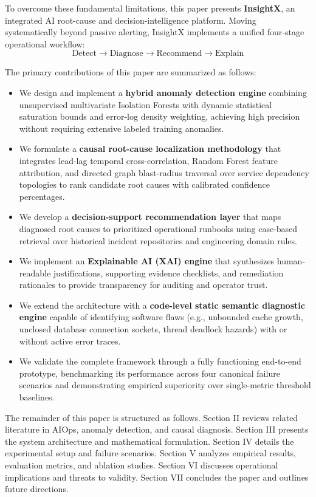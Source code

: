 \documentclass[conference]{IEEEtran}
\begin{document}
To overcome these fundamental limitations, this paper presents \textbf{InsightX}, an integrated AI root-cause and decision-intelligence platform. Moving systematically beyond passive alerting, InsightX implements a unified four-stage operational workflow:
$$\text{Detect} \longrightarrow \text{Diagnose} \longrightarrow \text{Recommend} \longrightarrow \text{Explain}$$

The primary contributions of this paper are summarized as follows:
\begin{itemize}
    \item We design and implement a \textbf{hybrid anomaly detection engine} combining unsupervised multivariate Isolation Forests with dynamic statistical saturation bounds and error-log density weighting, achieving high precision without requiring extensive labeled training anomalies.
    \item We formulate a \textbf{causal root-cause localization methodology} that integrates lead-lag temporal cross-correlation, Random Forest feature attribution, and directed graph blast-radius traversal over service dependency topologies to rank candidate root causes with calibrated confidence percentages.
    \item We develop a \textbf{decision-support recommendation layer} that maps diagnosed root causes to prioritized operational runbooks using case-based retrieval over historical incident repositories and engineering domain rules.
    \item We implement an \textbf{Explainable AI (XAI) engine} that synthesizes human-readable justifications, supporting evidence checklists, and remediation rationales to provide transparency for auditing and operator trust.
    \item We extend the architecture with a \textbf{code-level static semantic diagnostic engine} capable of identifying software flaws (e.g., unbounded cache growth, unclosed database connection sockets, thread deadlock hazards) with or without active error traces.
    \item We validate the complete framework through a fully functioning end-to-end prototype, benchmarking its performance across four canonical failure scenarios and demonstrating empirical superiority over single-metric threshold baselines.
\end{itemize}

The remainder of this paper is structured as follows. Section II reviews related literature in AIOps, anomaly detection, and causal diagnosis. Section III presents the system architecture and mathematical formulation. Section IV details the experimental setup and failure scenarios. Section V analyzes empirical results, evaluation metrics, and ablation studies. Section VI discusses operational implications and threats to validity. Section VII concludes the paper and outlines future directions.
\end{document}
